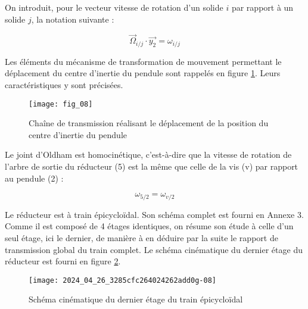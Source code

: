 On introduit, pour le vecteur vitesse de rotation d'un solide $i$ par rapport à un solide $j$, la notation suivante :

$$
\vec{\Omega}_{i / j} \cdot \overrightarrow{y_{2}}=\omega_{i / j}
$$

Les éléments du mécanisme de transformation de mouvement permettant le déplacement du centre d'inertie du pendule sont rappelés en figure \ref{ccmp2023_fig_08}. Leurs caractéristiques y sont précisées.

\begin{figure}[!h]
\centering
\texttt{[image: fig\_08]}
\caption{\label{ccmp2023_fig_08} Chaîne de transmission réalisant le déplacement de la position du centre d'inertie du pendule}
\end{figure}



Le joint d'Oldham est homocinétique, c'est-à-dire que la vitesse de rotation de l'arbre de sortie du réducteur (5) est la même que celle de la vis (v) par rapport au pendule (2) :

$$
\omega_{5 / 2}=\omega_{v / 2}
$$

Le réducteur est à train épicycloïdal. Son schéma complet est fourni en Annexe 3. Comme il est composé de 4 étages identiques, on résume son étude à celle d'un seul étage, ici le dernier, de manière à en déduire par la suite le rapport de transmission global du train complet. Le schéma cinématique du dernier étage du réducteur est fourni en figure \ref{ccmp2023_fig_09}.




\begin{figure}[!h]
\centering
\texttt{[image: 2024\_04\_26\_3285cfc264024262add0g-08]}
\caption{\label{ccmp2023_fig_09} Schéma cinématique du dernier étage du train épicycloïdal}
\end{figure}



